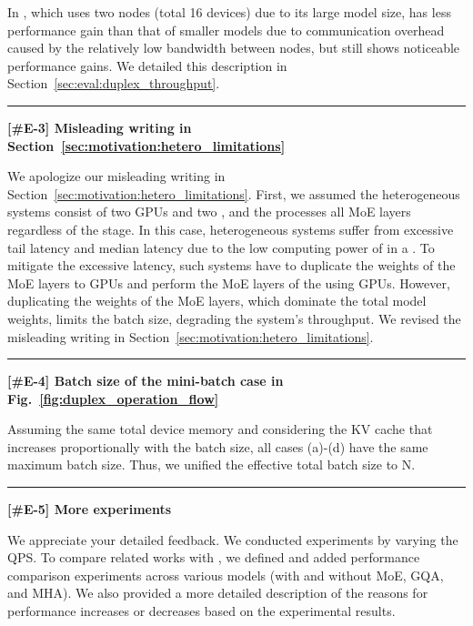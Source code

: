 In \grok, which uses two nodes (total 16 devices) due to its large model size, \duplex has less performance gain than that of smaller models due to communication overhead caused by the relatively low bandwidth between nodes, but still shows noticeable performance gains.
We detailed this description in Section~\ref{sec:eval:duplex_throughput}.



\noindent
\rule[0.5ex]{8.8cm}{0.5pt}

\noindent
\textbf{[\#E-3] Misleading writing in Section~\ref{sec:motivation:hetero_limitations}}
%

We apologize our misleading writing in Section~\ref{sec:motivation:hetero_limitations}.
First, we assumed the heterogeneous systems consist of two GPUs and two \lowp, and the \lowp processes all MoE layers regardless of the stage. In this case, heterogeneous systems suffer from excessive tail \tbt latency and median \ttft latency due to the low computing power of \lowp in a \mixedstage.
To mitigate the excessive latency, such systems have to duplicate the weights of the MoE layers to GPUs and perform the MoE layers of the \mixedstage using GPUs.
However, duplicating the weights of the MoE layers, which dominate the total model weights, limits the batch size, degrading the system's throughput.
We revised the misleading writing in Section~\ref{sec:motivation:hetero_limitations}.



\noindent
\rule[0.5ex]{8.8cm}{0.5pt}

\noindent
\textbf{[\#E-4] Batch size of the mini-batch case in Fig.~\ref{fig:duplex_operation_flow}}
%

Assuming the same total device memory and considering the KV cache that increases proportionally with the batch size, all cases (a)-(d) have the same maximum batch size. Thus, we unified the effective total batch size to N.


\noindent
\rule[0.5ex]{8.8cm}{0.5pt}

\noindent
\textbf{[\#E-5] More experiments}
%

We appreciate your detailed feedback.
We conducted experiments by varying the QPS.
To compare related works with \duplex, we defined \bankpim and added performance comparison experiments across various models (with and without MoE, GQA, and MHA). 
We also provided a more detailed description of the reasons for performance increases or decreases based on the experimental results.

